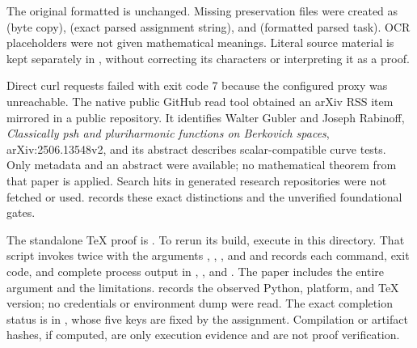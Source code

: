 \documentclass[11pt]{article}
\begin{document}
The original formatted  is unchanged. Missing preservation files were created as  (byte copy),  (exact parsed assignment string), and  (formatted parsed task). OCR placeholders  were not given mathematical meanings. Literal source material is kept separately in , without correcting its characters or interpreting it as a proof.

Direct curl requests failed with exit code 7 because the configured proxy was unreachable. The native public GitHub read tool obtained an arXiv RSS item mirrored in a public repository. It identifies Walter Gubler and Joseph Rabinoff, \emph{Classically psh and pluriharmonic functions on Berkovich spaces}, arXiv:2506.13548v2, and its abstract describes scalar-compatible curve tests. Only metadata and an abstract were available; no mathematical theorem from that paper is applied. Search hits in generated research repositories were not fetched or used.  records these exact distinctions and the unverified foundational gates.

The standalone TeX proof is . To rerun its build, execute  in this directory. That script invokes  twice with the arguments , , , and  and records each command, exit code, and complete process output in , , and . The paper includes the entire argument and the limitations.  records the observed Python, platform, and TeX version; no credentials or environment dump were read. The exact completion status is in , whose five keys are fixed by the assignment. Compilation or artifact hashes, if computed, are only execution evidence and are not proof verification.
\end{document}
